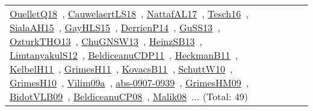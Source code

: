 {\begin{longtable}{lp{3cm}>{\raggedright\arraybackslash}p{6cm}>{\raggedright\arraybackslash}p{6cm}>{\raggedright\arraybackslash}p{8cm}}
\href{works/OuelletQ18.pdf}{OuelletQ18}~\cite{OuelletQ18}, \href{works/CauwelaertLS18.pdf}{CauwelaertLS18}~\cite{CauwelaertLS18}, \href{works/NattafAL17.pdf}{NattafAL17}~\cite{NattafAL17}, \href{works/Tesch16.pdf}{Tesch16}~\cite{Tesch16}, \href{works/SialaAH15.pdf}{SialaAH15}~\cite{SialaAH15}, \href{works/GayHLS15.pdf}{GayHLS15}~\cite{GayHLS15}, \href{works/DerrienP14.pdf}{DerrienP14}~\cite{DerrienP14}, \href{works/GuSS13.pdf}{GuSS13}~\cite{GuSS13}, \href{works/OzturkTHO13.pdf}{OzturkTHO13}~\cite{OzturkTHO13}, \href{works/ChuGNSW13.pdf}{ChuGNSW13}~\cite{ChuGNSW13}, \href{works/HeinzSB13.pdf}{HeinzSB13}~\cite{HeinzSB13}, \href{works/LimtanyakulS12.pdf}{LimtanyakulS12}~\cite{LimtanyakulS12}, \href{works/BeldiceanuCDP11.pdf}{BeldiceanuCDP11}~\cite{BeldiceanuCDP11}, \href{works/HeckmanB11.pdf}{HeckmanB11}~\cite{HeckmanB11}, \href{works/KelbelH11.pdf}{KelbelH11}~\cite{KelbelH11}, \href{works/GrimesH11.pdf}{GrimesH11}~\cite{GrimesH11}, \href{works/KovacsB11.pdf}{KovacsB11}~\cite{KovacsB11}, \href{works/SchuttW10.pdf}{SchuttW10}~\cite{SchuttW10}, \href{works/GrimesH10.pdf}{GrimesH10}~\cite{GrimesH10}, \href{works/Vilim09a.pdf}{Vilim09a}~\cite{Vilim09a}, \href{works/abs-0907-0939.pdf}{abs-0907-0939}~\cite{abs-0907-0939}, \href{works/GrimesHM09.pdf}{GrimesHM09}~\cite{GrimesHM09}, \href{works/BidotVLB09.pdf}{BidotVLB09}~\cite{BidotVLB09}, \href{works/BeldiceanuCP08.pdf}{BeldiceanuCP08}~\cite{BeldiceanuCP08}, \href{works/Malik08.pdf}{Malik08}~\cite{Malik08}... (Total: 49)\\

\end{longtable}}
